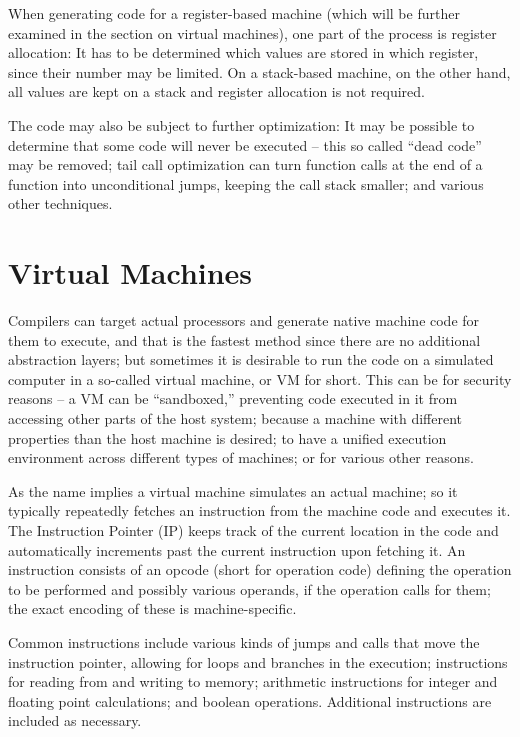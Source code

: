 		When generating code for a register-based machine (which will be further examined in the section on virtual machines), one part of the process is register allocation: It has to be determined which values are stored in which register, since their number may be limited. On a stack-based machine, on the other hand, all values are kept on a stack and register allocation is not required.
		
		The code may also be subject to further optimization: It may be possible to determine that some code will never be executed -- this so called ``dead code'' may be removed; tail call optimization can turn function calls at the end of a function into unconditional jumps, keeping the call stack smaller; and various other techniques.

	\section{Virtual Machines}
	
		Compilers can target actual processors and generate native machine code for them to execute, and that is the fastest method since there are no additional abstraction layers; but sometimes it is desirable to run the code on a simulated computer in a so-called virtual machine, or VM for short. This can be for security reasons -- a VM can be ``sandboxed,'' preventing code executed in it from accessing other parts of the host system; because a machine with different properties than the host machine is desired; to have a unified execution environment across different types of machines; or for various other reasons.
		
		As the name implies a virtual machine simulates an actual machine; so it typically repeatedly fetches an instruction from the machine code and executes it. The Instruction Pointer (IP) keeps track of the current location in the code and automatically increments past the current instruction upon fetching it. An instruction consists of an opcode (short for operation code) defining the operation to be performed and possibly various operands, if the operation calls for them; the exact encoding of these is machine-specific.
		
		Common instructions include various kinds of jumps and calls that move the instruction pointer, allowing for loops and branches in the execution; instructions for reading from and writing to memory; arithmetic instructions for integer and floating point calculations; and boolean operations. Additional instructions are included as necessary.
		
